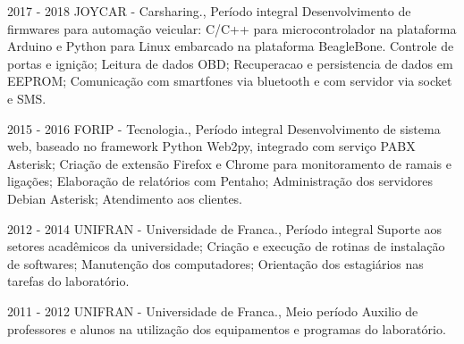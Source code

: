 

{2017 - 2018\space\space\space\space}
{JOYCAR - Carsharing., Período integral}
{Desenvolvimento de firmwares para automação veicular: C/C++ para
microcontrolador na plataforma Arduino e Python para Linux embarcado na
plataforma BeagleBone. Controle de portas e ignição; Leitura de dados OBD;
Recuperacao e persistencia de dados em EEPROM; Comunicação com smartfones via
bluetooth e com servidor via socket e SMS.
}
\sepspace


{2015 - 2016\space\space\space\space}
{FORIP - Tecnologia., Período integral}
{Desenvolvimento de sistema web, baseado no framework Python
Web2py, integrado com serviço PABX Asterisk; Criação de extensão Firefox e
Chrome para monitoramento de ramais e ligações; Elaboração de relatórios com
Pentaho; Administração dos servidores Debian Asterisk; Atendimento aos clientes.
}
\sepspace




{2012 - 2014\space\space\space\space\space}
{UNIFRAN - Universidade de Franca., Período integral}
{Suporte aos setores acadêmicos da universidade; Criação e execução de rotinas
de instalação de softwares; Manutenção dos computadores; Orientação dos
estagiários nas tarefas do laboratório.}
\sepspace


{2011 - 2012\space\space\space\space\space}
{UNIFRAN - Universidade de Franca., Meio período}
{Auxilio de professores e alunos na utilização dos equipamentos e programas do
laboratório.}
